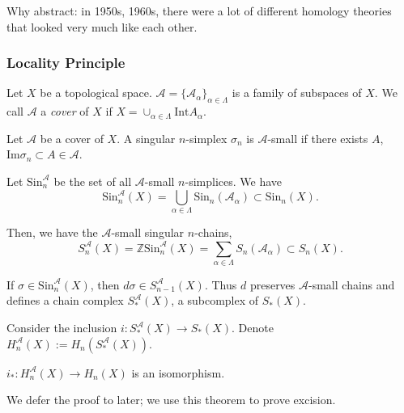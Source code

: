 \begin{remark}
	Why abstract: in 1950s, 1960s, there were a lot of different homology theories that looked very much like each other. 
\end{remark}

\subsubsection{Locality Principle}

\begin{definition}[Cover]
	\label{defn:Cover}
	Let $X$ be a topological space. $\mathcal{A} = \{\mathcal{A}_\alpha\} _{\alpha \in \Lambda}$ is a family of subspaces of $X$. We call $\mathcal{A}$ a \textit{cover} of $X$ if $X = \cup_{\alpha \in \Lambda} \text{Int}A_\alpha$. 
\end{definition}

\begin{definition}[A-Small]
	\label{defn:ASmall}
	Let $\mathcal{A}$ be a cover of $X$. A singular $n$-simplex $\sigma_n$ is $\mathcal{A}$-small if there exists $A$, $\text{Im}\sigma_n \subset A \in \mathcal{A}$.

	Let $\text{Sin}_n^{\mathcal{A}}$ be the set of all $\mathcal{A}$-small $n$-simplices. We have
	\[
		\text{Sin}_n^{\mathcal{A}}(X) = \bigcup_{\alpha \in \Lambda} \text{Sin}_n(\mathcal{A}_\alpha) \subset \text{Sin}_n(X)
	.\] 

	Then, we have the $\mathcal{A}$-small singular $n$-chains,
	\[
		S_n^{\mathcal{A}}(X) = \mathbb{Z}\text{Sin}_n^{\mathcal{A}}(X) = \sum_{\alpha \in \Lambda} S_n(\mathcal{A}_\alpha) \subset S_n(X)
	.\] 
\end{definition}

\begin{remark}
	If $\sigma \in \text{Sin}_n^{\mathcal{A}}(X)$, then $d \sigma \in S_{n - 1}^{\mathcal{A}}(X)$. Thus $d$ preserves $\mathcal{A}$-small chains and defines a chain complex $S_*^{\mathcal{A}}(X)$, a subcomplex of $S_*(X)$.
\end{remark}

Consider the inclusion $i: S_*^{\mathcal{A}}(X) \to S_*(X)$. Denote $H_n^{\mathcal{A}}(X) := H_n\left( S_*^{\mathcal{A}}(X) \right) $. 

\begin{theorem}
	\label{thm:LocalityPrinciple}
	$i_*: H_n^{\mathcal{A}} (X) \to H_n(X)$ is an isomorphism.
\end{theorem}

We defer the proof to later; we use this theorem to prove excision.

